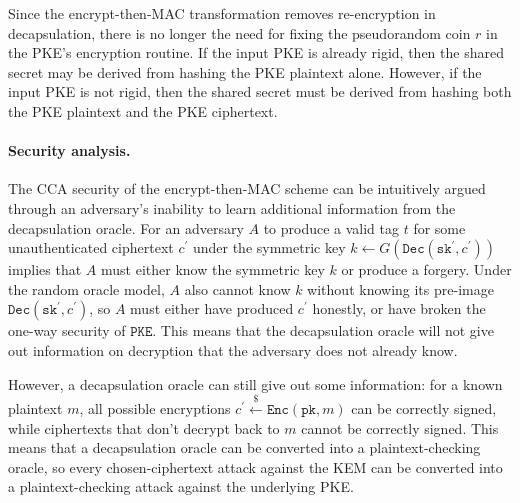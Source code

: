 \documentclass[runningheads]{llncs}
\newcommand{\pke}{\texttt{PKE}}
\newcommand{\encrypt}{\texttt{Enc}}
\newcommand{\decrypt}{\texttt{Dec}}
\newcommand{\kem}{\texttt{KEM}}
\newcommand{\etm}{\texttt{EtM}}  %
\newcommand{\pk}{\texttt{pk}}
\newcommand{\sk}{\texttt{sk}}
\newcommand{\leftsample}{\stackrel{\$}{\leftarrow}}
\begin{document}

Since the encrypt-then-MAC transformation removes re-encryption in decapsulation, there is no longer the need for fixing the pseudorandom coin $r$ in the PKE's encryption routine. If the input PKE is already rigid, then the shared secret may be derived from hashing the PKE plaintext alone. However, if the input PKE is not rigid, then the shared secret must be derived from hashing both the PKE plaintext and the PKE ciphertext. 

\paragraph{Security analysis.} The CCA security of the encrypt-then-MAC scheme can be intuitively argued through an adversary's inability to learn additional information from the decapsulation oracle. For an adversary $A$ to produce a valid tag $t$ for some unauthenticated ciphertext $c^\prime$ under the symmetric key $k \leftarrow G(\decrypt(\sk^\prime, c^\prime))$ implies that $A$ must either know the symmetric key $k$ or produce a forgery. Under the random oracle model, $A$ also cannot know $k$ without knowing its pre-image $\decrypt(\sk^\prime, c^\prime)$, so $A$ must either have produced $c^\prime$ honestly, or have broken the one-way security of $\pke$. This means that the decapsulation oracle will not give out information on decryption that the adversary does not already know. 

However, a decapsulation oracle can still give out some information: for a known plaintext $m$, all possible encryptions $c^\prime \leftsample \encrypt(\pk, m)$ can be correctly signed, while ciphertexts that don't decrypt back to $m$ cannot be correctly signed. This means that a decapsulation oracle can be converted into a plaintext-checking oracle, so every chosen-ciphertext attack against the KEM can be converted into a plaintext-checking attack against the underlying PKE.
\end{document}

